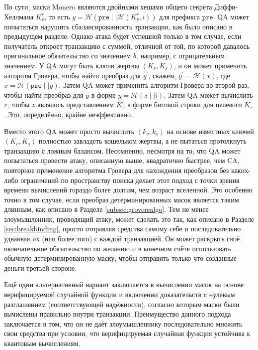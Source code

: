 \documentclass{mrl}
\begin{document}
По сути, маски Monero являются двойными хешами общего секрета Диффи-Хеллмана $K_v^r$, то есть $y = \mathcal{H}(\texttt{pre} \mid \mid \mathcal{H}(K_v^r, i))$ для префикса $\texttt{pre}$. QA может попытаться нарушить сбалансированность транзакции, как было описано в предыдущем разделе. Однако атака будет успешной только в том случае, если получатель откроет транзакцию с суммой, отличной от той, по которой давалось оригинальное обязательство со значением $b$, например, с отрицательным значением. У QA могут быть ключи жертвы $(K_v, K_s)$, и он может применить алгоритм Гровера, чтобы найти преобраз для $y^\prime$, скажем, $y^\prime = \mathcal{H}(x)$, где $x = \mathcal{H}(\texttt{pre} \mid \mid y)$. Затем QA может применить алгоритм Гровера во второй раз, чтобы найти преобраз для $y$ в форме $y = \mathcal{H}(z \mid \mid i)$. Затем QA может вычислить $r$, чтобы $z$ являлось представлением $K_v^r$ в форме битовой строки для целевого $K_v$. Это, определённо, крайне неэффективно.

Вместо этого QA может просто вычислить $(k_v, k_s)$ на основе известных ключей $(K_v, K_s)$ полностью завладеть кошельком жертвы, а не пытаться протолкнуть транзакцию с ложным балансом. Несомненно, несмотря на то, что QA может попытаться провести атаку, описанную выше, квадратично быстрее, чем CA, повторное применение алгоритма Гровера для нахождения преобразов без каких-либо ограничений по пространству поиска делает этот подход с точки зрения времени вычислений гораздо более долгим, чем возраст вселенной. Это особенно точно в том случае, если преобраз детерминированных масок является таким длинным, как описано в Разделе \ref{subsec:groversalgo}. Тем не менее злоумышленник, проводящий атаку, может сделать это так, как описано в Разделе \ref{sec:breakbinding}, просто отправляя средства самому себе и последовательно удваивая их (или более того) с каждой транзакцией. Он может раскрыть своё окончательное обязательство по желанию и в конечном счёте использовать обычную детерминированную маску, чтобы отправить только что созданные деньги третьей стороне.

Ещё один альтернативный вариант заключается в вычислении масок на основе верифицируемой случайной функции и включении доказательств с нулевым разглашением (соответствующей надёжности), согласно которым маски были вычислены правильно внутри транзакции. Преимущество данного подхода заключается в том, что он не даёт злоумышленнику последовательно множить свои средства при условии, что верифицируемая случайная функция устойчива к квантовым вычислениям.
\end{document}
